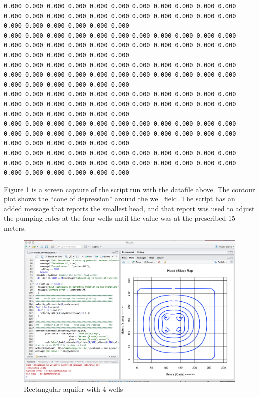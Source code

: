 \begin{lstlisting}[caption= Input file for 4 well example , label=lst:wellfield]
0.000 0.000 0.000 0.000 0.000 0.000 0.000 0.000 0.000 0.000 0.000 0.000 0.000 0.000 0.000 0.000 0.000 0.000 0.000 0.000 0.000 0.000 0.000 0.000 0.000 0.000 0.000 0.000
0.000 0.000 0.000 0.000 0.000 0.000 0.000 0.000 0.000 0.000 0.000 0.000 0.000 0.000 0.000 0.000 0.000 0.000 0.000 0.000 0.000 0.000 0.000 0.000 0.000 0.000 0.000 0.000
0.000 0.000 0.000 0.000 0.000 0.000 0.000 0.000 0.000 0.000 0.000 0.000 0.000 0.000 0.000 0.000 0.000 0.000 0.000 0.000 0.000 0.000 0.000 0.000 0.000 0.000 0.000 0.000
0.000 0.000 0.000 0.000 0.000 0.000 0.000 0.000 0.000 0.000 0.000 0.000 0.000 0.000 0.000 0.000 0.000 0.000 0.000 0.000 0.000 0.000 0.000 0.000 0.000 0.000 0.000 0.000
0.000 0.000 0.000 0.000 0.000 0.000 0.000 0.000 0.000 0.000 0.000 0.000 0.000 0.000 0.000 0.000 0.000 0.000 0.000 0.000 0.000 0.000 0.000 0.000 0.000 0.000 0.000 0.000
0.000 0.000 0.000 0.000 0.000 0.000 0.000 0.000 0.000 0.000 0.000 0.000 0.000 0.000 0.000 0.000 0.000 0.000 0.000 0.000 0.000 0.000 0.000 0.000 0.000 0.000 0.000 0.000
\end{lstlisting}

Figure \ref{fig:4WellsSteadyInR} is a screen capture of the script run with the datafile above. 
The contour plot shows the ``cone of depression'' around the well field.
The script has an added message that reports the smallest head, and that report was used to adjust the pumping rates at the four wells until the value was at the prescribed 15 meters.
\newpage

\begin{figure}[h!] %
   \centering
   \includegraphics[width=6in]{./17-SteadyGroundwaterFlow/4WellsSteadyInR.jpg} 
   \caption{Rectangular aquifer with 4 wells}
   \label{fig:4WellsSteadyInR}
\end{figure}

